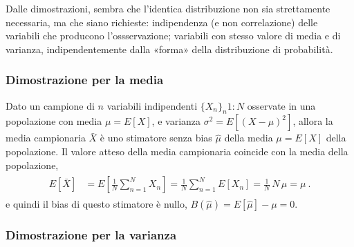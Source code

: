 \documentclass[letterpaper,10pt,italian]{jupyterBook}
\begin{document}
\sphinxAtStartPar
{}  Dalle dimostrazioni, sembra che l’identica distribuzione non sia strettamente necessaria, ma che siano richieste: indipendenza (e non correlazione) delle variabili che producono l’ossservazione; variabili con stesso valore di media e di varianza, indipendentemente dalla «forma» della distribuzione di probabilità.
\subsubsection*{Dimostrazione per la media}

\sphinxAtStartPar
Dato un campione di \(n\) variabili indipendenti \(\{ X_n \}_n{1:N}\) osservate in una popolazione con media \(\mu = E[X]\), e varianza \(\sigma^2 = E\left[ (X-\mu)^2 \right]\), allora la media campionaria \(\bar{X}\) è uno stimatore senza bias \(\hat{\mu}\) della media \(\mu = E[X]\) della popolazione. Il valore atteso della media campionaria coincide con la media della popolazione,
\begin{equation*}
\begin{split}\begin{aligned}
  E[\bar{X}] 
  & = E\left[ \frac{1}{N} \sum_{n=1}^N X_n \right]
    = \frac{1}{N} \sum_{n=1}^N E\left[ X_n \right] = \frac{1}{N} \, N \, \mu = \mu \ .
\end{aligned}\end{split}
\end{equation*}
\sphinxAtStartPar
e quindi il bias di questo stimatore è nullo, \(B(\hat{\mu}) = E[\hat{\mu}] - \mu = 0\).
\subsubsection*{Dimostrazione per la varianza}
\end{document}
